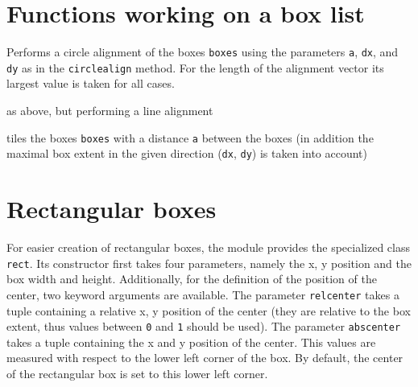 \section{Functions working on a box list}

\begin{description}
\raggedright
\item[\texttt{circlealignequal(boxes, a, dx, dy)}:] Performs a circle
alignment of the boxes \verb|boxes| using the parameters \verb|a|,
\verb|dx|, and \verb|dy| as in the \verb|circlealign| method. For the
length of the alignment vector its largest value is taken for all
cases.
\item[\texttt{linealignequal(boxes, a, dx, dy)}:] as above, but
performing a line alignment
\item[\texttt{tile(boxes, a, dx, dy)}:] tiles the boxes \verb|boxes|
with a distance \verb|a| between the boxes (in addition the maximal box
extent in the given direction (\verb|dx|, \verb|dy|) is taken into
account)
\end{description}

\section{Rectangular boxes}

For easier creation of rectangular boxes, the module provides the
specialized class \verb|rect|. Its constructor first takes four
parameters, namely the x, y position and the box width and height.
Additionally, for the definition of the position of the center, two
keyword arguments are available. The parameter \verb|relcenter| takes
a tuple containing a relative x, y position of the center (they are
relative to the box extent, thus values between \verb|0| and
\verb|1| should be used). The parameter \verb|abscenter| takes a tuple
containing the x and y position of the center. This values are
measured with respect to the lower left corner of the box. By
default, the center of the rectangular box is set to this lower left
corner.

